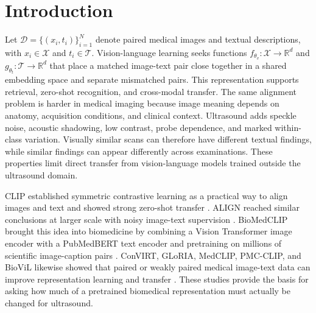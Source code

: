 \documentclass[runningheads]{llncs}
\begin{document}

\section{Introduction}

Let $\mathcal{D}=\{(x_i,t_i)\}_{i=1}^{N}$ denote paired medical images and textual descriptions, with $x_i\in\mathcal{X}$ and $t_i\in\mathcal{T}$. Vision-language learning seeks functions $f_{\theta_v}:\mathcal{X}\rightarrow\mathbb{R}^{d}$ and $g_{\theta_t}:\mathcal{T}\rightarrow\mathbb{R}^{d}$ that place a matched image-text pair close together in a shared embedding space and separate mismatched pairs. This representation supports retrieval, zero-shot recognition, and cross-modal transfer.
The same alignment problem is harder in medical imaging because image meaning depends on anatomy, acquisition conditions, and clinical context. Ultrasound adds speckle noise, acoustic shadowing, low contrast, probe dependence, and marked within-class variation. Visually similar scans can therefore have different textual findings, while similar findings can appear differently across examinations. These properties limit direct transfer from vision-language models trained outside the ultrasound domain.

CLIP established symmetric contrastive learning as a practical way to align images and text and showed strong zero-shot transfer \cite{radford2021clip}. ALIGN reached similar conclusions at larger scale with noisy image-text supervision \cite{jia2021align}. BioMedCLIP brought this idea into biomedicine by combining a Vision Transformer image encoder with a PubMedBERT text encoder and pretraining on millions of scientific image-caption pairs \cite{zhang2023biomedclip,dosovitskiy2021vit,gu2021pubmedbert}. ConVIRT, GLoRIA, MedCLIP, PMC-CLIP, and BioViL likewise showed that paired or weakly paired medical image-text data can improve representation learning and transfer \cite{zhang2020convirt,huang2021gloria,wang2022medclip,lin2023pmcclip,boecking2022biovil}. These studies provide the basis for asking how much of a pretrained biomedical representation must actually be changed for ultrasound.
\end{document}
